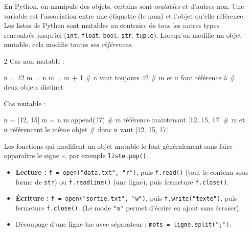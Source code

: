 \documentclass[11pt,a4paper]{article}
\begin{document}
	
	\begin{tcolorbox}[left=0cm,title=\bf{\faPython \; Mutables et non mutables},colbacktitle=cfond]
		En Python, on manipule des objets, certains sont \textit{mutables} et d'autres non. Une variable est l'association entre une étiquette (le nom) et l'objet qu'elle référence. Les listes de Python sont mutables au contraire de tous les autres types rencontrés jusqu'ici ({\tt int}, {\tt float}, {\tt bool}, {\tt str}, {\tt tuple}). Lorsqu'on modifie un objet mutable, cela modifie toutes ses \textit{références}.
			
		\setlength{\multicolsep}{0pt}
		\begin{multicols}{2}
			Cas non mutable :
			\begin{python}
	n = 42
	m = n
	m = m + 1
	# n vaut toujours 42
	# m et n font référence à
	# deux objets distinct
	\end{python}
			Cas mutable : 
			\begin{python} 
	n = [12, 15]
	m = n
	m.append(17)
	# m référence maintenant [12, 15, 17]
	# m et n référencent le même objet
	# donc n vaut [12, 15, 17]
			\end{python}
		\end{multicols}
		Les fonctions qui modifient un objet mutable le font généralement sans faire apparaître le signe {\tt =}, par exemple \texttt{liste.pop()}.
	\end{tcolorbox}

	\begin{tcolorbox}[left=0cm,title=\bf{\faPython \; Fichiers textes},colbacktitle=cfond]
		\begin{itemize}
			\item[\textbullet] \textbf{Lecture :} \texttt{f = open("data.txt", "r")}, puis \texttt{f.read()} (tout le contenu sous forme de \texttt{str}) ou \texttt{f.readline()} (une ligne), puis fermeture \texttt{f.close()}.
			\item[\textbullet] \textbf{Écriture :} \texttt{f = open("sortie.txt", "w")}, puis \texttt{f.write("texte\n")}, puis fermeture \texttt{f.close()}. (Le mode \texttt{"a"} permet d'écrire en ajout sans écraser).
			\item[\textbullet] Découpage d'une ligne lue avec séparateur : \texttt{mots = ligne.split(";")}.
		\end{itemize}
	\end{tcolorbox}
\end{document}
